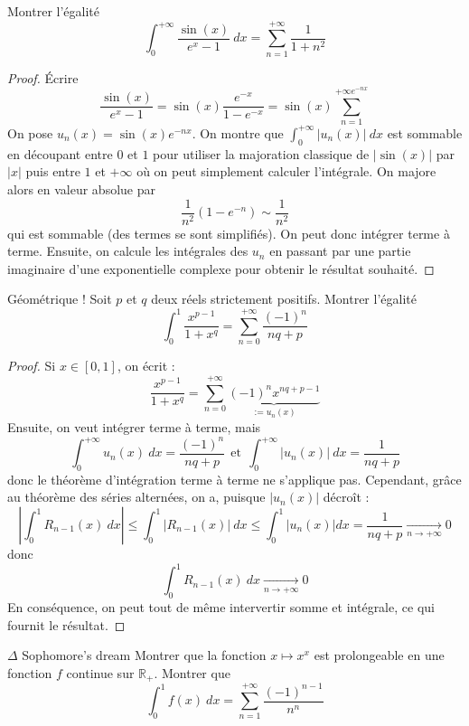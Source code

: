 \documentclass[french,a4paper]{article}
\newcommand{\R}{\mathbb{R}}
\theoremstyle{plain}
\theoremstyle{definition}
\theoremstyle{remark}
\begin{document}
\begin{ex}[Moulin.IP.09]{}
	Montrer l'égalité $$\int_{0}^{+\infty}\frac{\sin(x)}{e^x-1}\ dx=\sum_{n=1}^{+\infty}\frac{1}{1+n^2}$$
\end{ex}
\begin{proof}
	Écrire $$\frac{\sin(x)}{e^x-1}=\sin(x)\frac{e^{-x}}{1-e^{-x}}=\sin(x)\sum_{n=1}^{+\infty e^{-nx}}$$ On pose $u_n(x)=\sin(x)e^{-nx}$. On montre que $\displaystyle\int_{0}^{+\infty}\lvert u_n(x)\rvert\ dx$ est sommable en découpant entre $0$ et $1$ pour utiliser la majoration classique de $\lvert\sin(x)\rvert$ par $\lvert x\rvert$ puis entre $1$ et $+\infty$ où on peut simplement calculer l'intégrale. On majore alors en valeur absolue par $$\frac{1}{n^2}(1-e^{-n})\sim\frac{1}{n^2}$$ qui est sommable (des termes se sont simplifiés). On peut donc intégrer terme à terme. Ensuite, on calcule les intégrales des $u_n$ en passant par une partie imaginaire d'une exponentielle complexe pour obtenir le résultat souhaité.
\end{proof}
\begin{ex}[Moulin.IP.10]{Géométrique !}
	Soit $p$ et $q$ deux réels strictement positifs. Montrer l'égalité $$\int_{0}^{1}\frac{x^{p-1}}{1+x^q}=\sum_{n=0}^{+\infty}\frac{(-1)^n}{nq+p}$$
\end{ex}
\begin{proof}
	Si $x\in[0,1]$, on écrit : $$\frac{x^{p-1}}{1+x^q}=\sum_{n=0}^{+\infty}\underbrace{(-1)^nx^{nq+p-1}}_{:=u_n(x)}$$ Ensuite, on veut intégrer terme à terme, mais $$\int_{0}^{+\infty}u_n(x)\ dx=\frac{(-1)^n}{nq+p} \ \ \text{et}\ \ \int_{0}^{+\infty}\lvert u_n(x)\rvert\ dx=\frac{1}{nq+p}$$ donc le théorème d'intégration terme à terme ne s'applique pas. Cependant, grâce au théorème des séries alternées, on a, puisque $\lvert u_n(x)\rvert$ décroît : $$\left\lvert\int_{0}^{1}R_{n-1}(x)\ dx\right\rvert\leqslant\int_{0}^{1}\lvert R_{n-1}(x)\rvert\ dx\leqslant\int_{0}^{1}\lvert u_n(x)\rvert dx=\frac{1}{nq+p}\xrightarrow[n\to+\infty]{}0$$ donc $$\int_{0}^{1}R_{n-1}(x)\ dx\xrightarrow[n\to+\infty]{}0$$ En conséquence, on peut tout de même intervertir somme et intégrale, ce qui fournit le résultat.
\end{proof}
\begin{ex}[Moulin.IP.11]{$\Delta$ Sophomore's dream}
	Montrer que la fonction $x\mapsto x^x$ est prolongeable en une fonction $f$ continue sur $\R_+$. Montrer que $$\int_{0}^{1}f(x)\ dx=\sum_{n=1}^{+\infty}\frac{(-1)^{n-1}}{n^n}$$
\end{ex}
\end{document}
